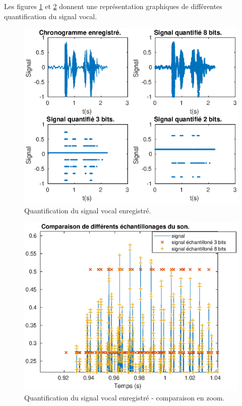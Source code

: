 \documentclass[french]{article}
\begin{document}
Les figures \ref{sonQuantifie1} et \ref{sonQuantifie2} donnent une représentation graphiques de différentes quantification du signal vocal.

\begin{figure}[!h]
\centering
\includegraphics[height=0.45\textheight]{images/sonQuantifie2.eps}
\caption{Quantification du signal vocal enregistré.}
\label{sonQuantifie1}
\end{figure}

\begin{figure}[!h]
\centering
\includegraphics[height=0.45\textheight]{images/sonQuantifie.eps}
\caption{Quantification du signal vocal enregistré - comparaison en zoom.}
\label{sonQuantifie2}
\end{figure}
\end{document}
